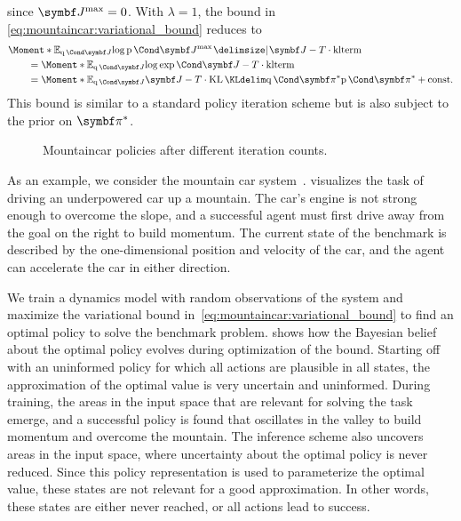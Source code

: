 since $\mat{J}^\text{max} = 0$.
With $\lambda = 1$, the bound in \cref{eq:mountaincar:variational_bound} reduces to
\begin{equation}
    \begin{split}
        \MoveEqLeft\Moment*{\E_{\Variat{\mat{J}}}}{\log \Prob{\mat{J}^{\text{max}} \given \mat{J}}} - T \cdot \text{klterm}
        \\
        &= \Moment*{\E_{\Variat{\mat{J}}}}{\log \Fun{\exp}{\mat{J}}} - T \cdot \text{klterm}
        \\
        &= \Moment*{\E_{\Variat{\mat{J}}}}{\mat{J}} - T \cdot \KL{\Variat{\mat{\pi}^\ast}}{\Prob{\mat{\pi}^\ast}} + \text{const}.
    \end{split}
\end{equation}
This bound is similar to a standard policy iteration scheme but is also subject to the prior on $\mat{\pi}^\ast$.

\begin{figure}[tp]
    \centering
    
    
    
    \caption{
        \label{fig:mountaincar:policy}
        Mountaincar policies after different iteration counts.
    }
\end{figure}
As an example, we consider the mountain car system~\parencite{moore_efficient_1990,sutton_reinforcement_2018}.
 visualizes the task of driving an underpowered car up a mountain.
The car's engine is not strong enough to overcome the slope, and a successful agent must first drive away from the goal on the right to build momentum.
The current state of the benchmark is described by the one-dimensional position and velocity of the car, and the agent can accelerate the car in either direction.

We train a dynamics model with random observations of the system and maximize the variational bound in~\cref{eq:mountaincar:variational_bound} to find an optimal policy to solve the benchmark problem.
 shows how the Bayesian belief about the optimal policy evolves during optimization of the bound.
Starting off with an uninformed policy for which all actions are plausible in all states, the approximation of the optimal value is very uncertain and uninformed.
During training, the areas in the input space that are relevant for solving the task emerge, and a successful policy is found that oscillates in the valley to build momentum and overcome the mountain.
The inference scheme also uncovers areas in the input space, where uncertainty about the optimal policy is never reduced.
Since this policy representation is used to parameterize the optimal value, these states are not relevant for a good approximation.
In other words, these states are either never reached, or all actions lead to success.

